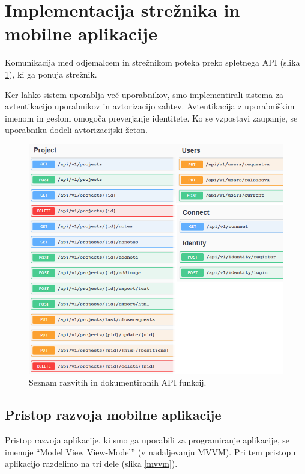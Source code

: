 \documentclass[a4paper, 12pt]{book}
\begin{document}
\section{Implementacija strežnika in mobilne aplikacije}

Komunikacija med odjemalcem in strežnikom poteka preko spletnega API (slika \ref{api_routes}), ki ga ponuja strežnik.

Ker lahko sistem uporablja več uporabnikov, smo implementirali sistema za avtentikacijo uporabnikov in avtorizacijo zahtev.
Avtentikacija z uporabniškim imenom in geslom omogoča preverjanje identitete.
Ko se vzpostavi zaupanje, se uporabniku dodeli avtorizacijski žeton.


\begin{figure}[H]
\begin{center}
\includegraphics[width=13.5cm]{api_routes_small}
\end{center}
\caption{Seznam razvitih in dokumentiranih API funkcij.}
\label{api_routes}
\end{figure}

\subsection{Pristop razvoja mobilne aplikacije}

Pristop razvoja aplikacije, ki smo ga uporabili za programiranje aplikacije, se imenuje \enquote{Model View View-Model} (v nadaljevanju MVVM).
Pri tem pristopu aplikacijo razdelimo na tri dele (slika \ref{mvvm}).
\end{document}
